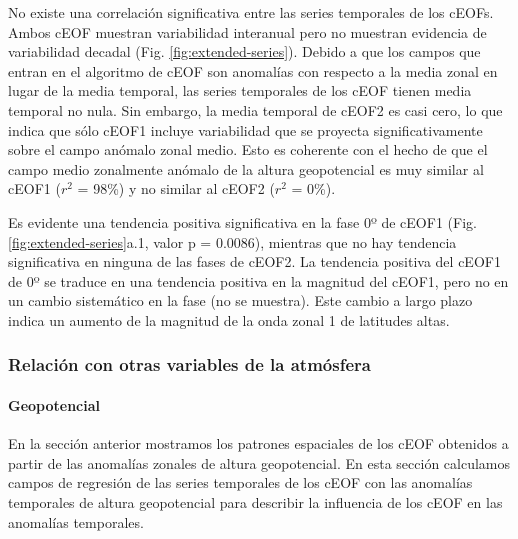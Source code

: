 \documentclass[12pt,oneside]{reedthesis}
\begin{document}
No existe una correlación significativa entre las series temporales de los cEOFs.
Ambos cEOF muestran variabilidad interanual pero no muestran evidencia de variabilidad decadal (Fig. \ref{fig:extended-series}).
Debido a que los campos que entran en el algoritmo de cEOF son anomalías con respecto a la media zonal en lugar de la media temporal, las series temporales de los cEOF tienen media temporal no nula.
Sin embargo, la media temporal de cEOF2 es casi cero, lo que indica que sólo cEOF1 incluye variabilidad que se proyecta significativamente sobre el campo anómalo zonal medio.
Esto es coherente con el hecho de que el campo medio zonalmente anómalo de la altura geopotencial es muy similar al cEOF1 (\(r^2\) = 98\%) y no similar al cEOF2 (\(r^2\) = 0\%).

Es evidente una tendencia positiva significativa en la fase 0º de cEOF1 (Fig. \ref{fig:extended-series}a.1, valor p = 0.0086), mientras que no hay tendencia significativa en ninguna de las fases de cEOF2.
La tendencia positiva del cEOF1 de 0º se traduce en una tendencia positiva en la magnitud del cEOF1, pero no en un cambio sistemático en la fase (no se muestra).
Este cambio a largo plazo indica un aumento de la magnitud de la onda zonal 1 de latitudes altas.

\hypertarget{relaciuxf3n-con-otras-variables-de-la-atmuxf3sfera}{%
\subsubsection{Relación con otras variables de la atmósfera}\label{relaciuxf3n-con-otras-variables-de-la-atmuxf3sfera}}

\hypertarget{geopotencial}{%
\paragraph{Geopotencial}\label{geopotencial}}

En la sección anterior mostramos los patrones espaciales de los cEOF obtenidos a partir de las anomalías zonales de altura geopotencial.
En esta sección calculamos campos de regresión de las series temporales de los cEOF con las anomalías temporales de altura geopotencial para describir la influencia de los cEOF en las anomalías temporales.
\end{document}
